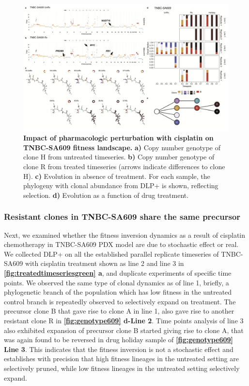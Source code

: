 \begin{figure}
\centering
\includegraphics[width=\textwidth]{Figures/chap4/genePlotSA609.png}
	
\caption[Impact of pharmacologic perturbation with cisplatin on TNBC-SA609 fitness landscape]
	{\small
	\textbf{Impact of pharmacologic perturbation with cisplatin on TNBC-SA609 fitness landscape.}
	 \textbf{a)} Copy number genotype of clone H from untreated timeseries. \textbf{b)} Copy number genotype of clone R from treated timeseries (arrows indicate differences to clone H). \textbf{c)}  Evolution in absence of treatment. For each sample, the phylogeny with clonal abundance from DLP+ is shown, reflecting selection. \textbf{d)} Evolution as a function of drug treatment.}
\label{fig:genotype609}
\end{figure}


\subsubsection{Resistant clones in TNBC-SA609 share the same precursor}
Next, we examined whether the fitness inversion dynamics as a result of cisplatin chemotherapy in TNBC-SA609 PDX model are due to stochastic effect or real.
We collected DLP+ on all the established parallel replicate timeseries of TNBC-SA609 with cisplatin treatment shown as line 2 and line 3 in \textbf{\autoref{fig:treatedtimeseriesgreen} a}, and duplicate experiments of specific time points. We observed the same type of clonal dynamics as of line 1, briefly, a phylogenetic branch of the population which has low fitness in the untreated control branch is repeatedly observed to selectively expand on treatment. The precursor clone B that gave rise to clone A in line 1, also gave rise to another resistant clone R in \textbf{\autoref{fig:genotype609} d-Line 2}. Time points analysis of line 3 also exhibited expansion of precursor clone B started giving rise to clone A, that was again found to be reversed in drug holiday sample of \textbf{\autoref{fig:genotype609} Line 3}. This indicates that the fitness inversion is not a stochastic effect and establishes with precision that high fitness lineages in the untreated setting are selectively pruned, while low fitness lineages in the untreated setting selectively expand.

